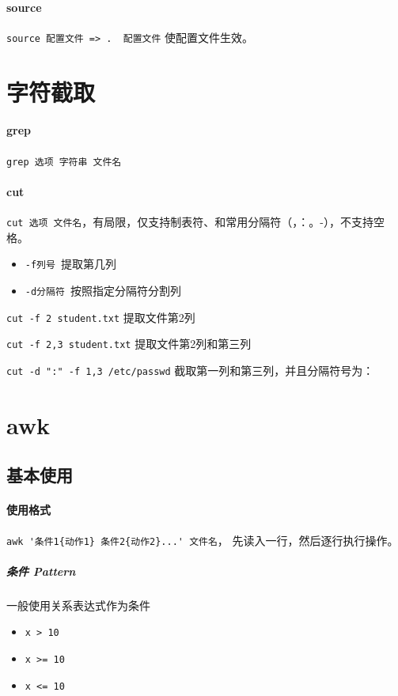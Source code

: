 \documentclass[UTF8,a4paper,12pt]{ctexbook}
\begin{document}
		\paragraph{source}\verb|source 配置文件 => .  配置文件| 使配置文件生效。
	
	\section{字符截取}
		\paragraph{grep}\verb|grep 选项 字符串 文件名|

		\paragraph{cut}\verb|cut 选项 文件名|，有局限，仅支持制表符、和常用分隔符（，：。-），不支持空格。
			\begin{itemize}
				\item \verb|-f列号 |提取第几列
				\item \verb|-d分隔符 |按照指定分隔符分割列
			\end{itemize}
			
			\verb|cut -f 2 student.txt| 提取文件第2列
			
			\verb|cut -f 2,3 student.txt| 提取文件第2列和第三列
			
			\verb|cut -d ":" -f 1,3 /etc/passwd| 截取第一列和第三列，并且分隔符号为：
	
	\section{awk}
		\subsection{基本使用}
			\paragraph{使用格式}
				\verb|awk '条件1{动作1} 条件2{动作2}...' 文件名|， 先读入一行，然后逐行执行操作。
				
				\subparagraph{条件 Pattern}一般使用关系表达式作为条件
					\begin{itemize}[itemindent = 1em]
						\item \verb|x > 10|
						\item \verb|x >= 10|
						\item \verb|x <= 10|
					\end{itemize}
			
\end{document}
